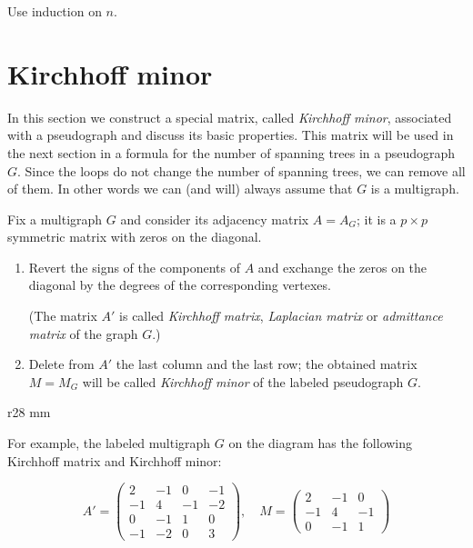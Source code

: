  Use induction on $n$.

\section*{Kirchhoff minor}

In this section we construct a special matrix, called {}\emph{Kirchhoff minor}, associated with a pseudograph
and discuss its basic properties.
This matrix will be used in the next section in a formula for the number of spanning trees in a pseudograph~$G$.
Since the loops do not change the number of spanning trees, we can remove all of them.
In other words we can (and will) always assume that $G$ is a multigraph. 

Fix a multigraph $G$ and consider its adjacency matrix $A=A_G$;
it is a $p{\times}p$ symmetric matrix with zeros on the diagonal.

\begin{enumerate}
\item Revert the signs of the components of $A$ and exchange the zeros on the diagonal by the degrees of the corresponding vertexes. 

(The matrix $A'$ is called \emph{Kirchhoff matrix}, \emph{Laplacian matrix} or \emph{admittance matrix} of the graph $G$.)
\item Delete from $A'$ the last column and the last row;
the obtained matrix $M=M_G$ will be called \emph{Kirchhoff minor} of the labeled pseudograph $G$.
\end{enumerate}

{

\begin{wrapfigure}{r}{28 mm}
\end{wrapfigure}

For example, the labeled multigraph $G$ on the diagram has the following Kirchhoff matrix and Kirchhoff minor:

\[A'=\left(
\begin{matrix}
2&-1&0&-1
\\
-1&4&-1&-2
\\
0&-1&1&0
\\
-1&-2&0&3
\end{matrix}
\right),
\quad 
M=\left(
\begin{matrix}
2&-1&0
\\
-1&4&-1
\\
0&-1&1
\end{matrix}
\right)\]

}


